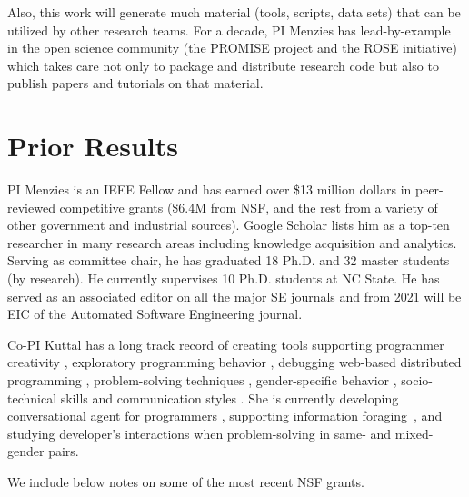 \documentclass[twoside]{NSF}
\begin{document}
\begin{nsfdescription}
Also, this work will generate much  material (tools, scripts, data sets) that can be utilized by other research teams. 
For  a decade, PI Menzies has  lead-by-example in the open science community (the PROMISE project and the ROSE initiative) which takes care
not only to package and distribute research code but also to publish papers and tutorials on that material.  
 


 
 \section{Prior Results}\label{sec:PriorResults}
 

 
PI Menzies is an IEEE Fellow and has earned over \$13 million dollars in peer-reviewed competitive grants (\$6.4M from NSF, and  the rest from a variety of other government and industrial sources).
Google Scholar lists him as a top-ten researcher in many research areas including knowledge acquisition and analytics. Serving as committee chair, he has graduated 18 Ph.D. and 32 master students (by research). He currently supervises 10 Ph.D. students at NC State. He has served as an associated editor on all the major SE journals and from 2021 will be EIC of the Automated Software Engineering journal. 


Co-PI Kuttal has a long  track record of creating tools   supporting programmer creativity \cite{Kuttal2020}, exploratory programming behavior \cite{Jernigan2017, Jernigan2015}, debugging web-based distributed programming \cite{KuttalSR13-chi, KuttalSBRKS19}, %
problem-solving techniques \cite{Jernigan2017, Jernigan2015}, gender-specific behavior \cite{Kuttal2021g, Kuttal2019, Alexposter2022}, socio-technical skills \cite{Abimposter2022,Abimgitposter2022,Diwanjiposter2022,Zhou2018, sarma2016hiring, KuttalCWBS21, KuttalSRW18, abs-1810-13062} and communication styles \cite{Kuttal2020}.  She is currently developing conversational agent for programmers \cite{Kuttal2020, Kuttal2021,tochipaper, RobeFSE2022, Robe2020, Hartposter2022, Alexposter2022}, supporting information foraging~\cite{Abimposter2022,Abimgitposter2022,Diwanjiposter2022}, and  studying developer's   interactions when problem-solving in same- and mixed- gender pairs.


 We include below notes on some of the most recent NSF grants.


\end{nsfdescription}
\end{document}
